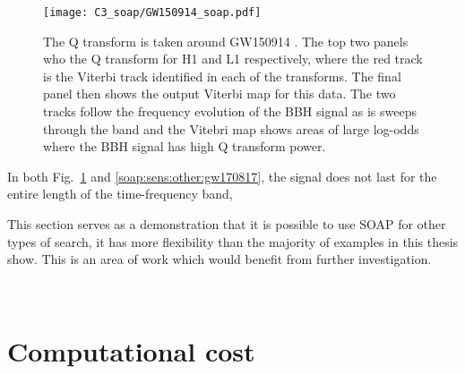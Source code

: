 \begin{figure}[ht]
	\centering
	\texttt{[image: C3\_soap/GW150914\_soap.pdf]}
        \caption[SOAP search run on GW150914]{The Q transform is taken around GW150914 \citep{abbott2016ObservationGravitational}. The top two panels who the Q transform for H1 and L1 respectively, where the red track is the Viterbi track identified in each of the transforms. The final panel then shows the output Viterbi map for this data. The two tracks follow the frequency evolution of the \gls{BBH} signal as is sweeps through the band and the Vitebri map shows areas of large log-odds where the \gls{BBH} signal has high Q transform power.}
\label{soap:sens:other:gw150914}

\end{figure}

In both Fig.~\ref{soap:sens:other:gw150914} and \ref{soap:sens:other:gw170817}, the signal does not last for the entire length of the time-frequency band, 

This section serves as a demonstration that it is possible to use SOAP for other types of search, it has more flexibility than the majority of examples in this thesis show.
This is an area of work which would benefit from further
investigation.


~

\clearpage

\section{\label{soap:results:time}Computational cost}

